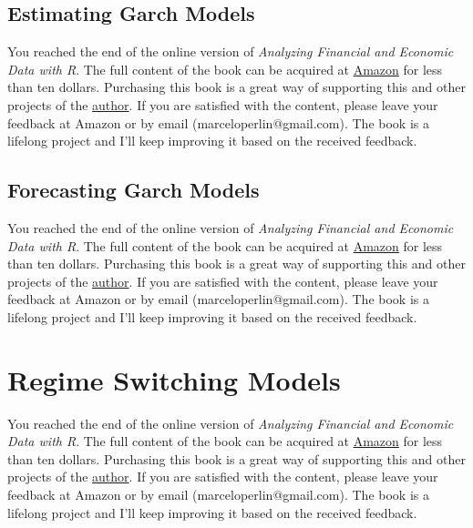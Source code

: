 \documentclass[
  12pt,
]{book}
\newenvironment{pleasebuyit}
{\begin{noteblock}
		
	} {\end{noteblock}}
\begin{document}
\hypertarget{estimating-garch}{%
\subsection{Estimating Garch Models}\label{estimating-garch}}

\begin{pleasebuyit}
You reached the end of the online version of \emph{Analyzing Financial
and Economic Data with R}. The full content of the book can be acquired
at \href{https://www.amazon.com/dp/B084LSNXMN}{Amazon} for less than ten
dollars. Purchasing this book is a great way of supporting this and
other projects of the \href{https://www.msperlin.com/}{author}. If you
are satisfied with the content, please leave your feedback at Amazon or
by email (marceloperlin@gmail.com). The book is a lifelong project and
I'll keep improving it based on the received feedback.
\end{pleasebuyit}

\hypertarget{forecasting-garch-models}{%
\subsection{Forecasting Garch Models}\label{forecasting-garch-models}}

\begin{pleasebuyit}
You reached the end of the online version of \emph{Analyzing Financial
and Economic Data with R}. The full content of the book can be acquired
at \href{https://www.amazon.com/dp/B084LSNXMN}{Amazon} for less than ten
dollars. Purchasing this book is a great way of supporting this and
other projects of the \href{https://www.msperlin.com/}{author}. If you
are satisfied with the content, please leave your feedback at Amazon or
by email (marceloperlin@gmail.com). The book is a lifelong project and
I'll keep improving it based on the received feedback.
\end{pleasebuyit}

\hypertarget{regime-switching-models}{%
\section{Regime Switching Models}\label{regime-switching-models}}

\begin{pleasebuyit}
You reached the end of the online version of \emph{Analyzing Financial
and Economic Data with R}. The full content of the book can be acquired
at \href{https://www.amazon.com/dp/B084LSNXMN}{Amazon} for less than ten
dollars. Purchasing this book is a great way of supporting this and
other projects of the \href{https://www.msperlin.com/}{author}. If you
are satisfied with the content, please leave your feedback at Amazon or
by email (marceloperlin@gmail.com). The book is a lifelong project and
I'll keep improving it based on the received feedback.
\end{pleasebuyit}
\end{document}
